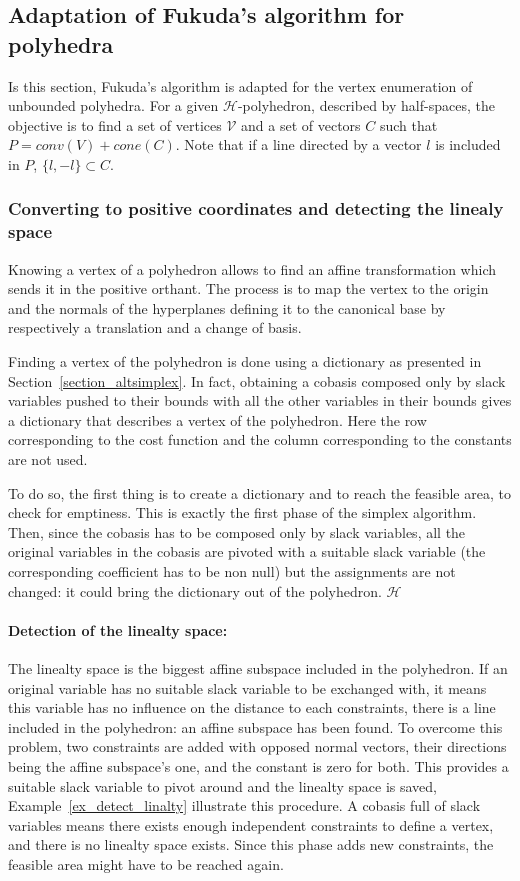 \subsection{Adaptation of Fukuda's algorithm for polyhedra}

Is this section, Fukuda's algorithm is adapted for the vertex enumeration of unbounded polyhedra. For a given $\mathcal{H}$-polyhedron, described by half-spaces, the objective is to find a set of vertices $\mathcal{V}$ and a set of vectors $C$ such that $P = conv(V)+cone(C)$. Note that if a line directed by a vector $l$ is included in $P$, $\{l,-l\}\subset C$. 

\subsubsection{Converting to positive coordinates and detecting the linealy space}

Knowing a vertex of a polyhedron allows to find an affine transformation which sends it in the positive orthant. The process is to map the vertex to the origin and the normals of the hyperplanes defining it to the canonical base by respectively a translation and a change of basis.

Finding a vertex of the polyhedron is done using a dictionary as presented in Section~\ref{section_altsimplex}. In fact, obtaining a cobasis composed only by slack variables pushed to their bounds with all the other variables in their bounds gives a dictionary that describes a vertex of the polyhedron. Here the row corresponding to the cost function and the column corresponding to the constants are not used.


To do so, the first thing is to create a dictionary and to reach the feasible area, to check for emptiness. This is exactly the first phase of the simplex algorithm. Then, since the cobasis has to be composed only by slack variables, all the original variables in the cobasis are pivoted with a suitable slack variable (the corresponding coefficient has to be non null) but the assignments are not changed: it could bring the dictionary out of the polyhedron. 
$\mathcal{H}$
\paragraph*{Detection of the linealty space:} The linealty space is the biggest affine subspace included in the polyhedron. If an original variable has no suitable slack variable to be exchanged with, it means this variable has no influence on the distance to each constraints, there is a line included in the polyhedron: an affine subspace has been found. To overcome this problem, two constraints are added with opposed normal vectors, their directions being the affine subspace's one, and the constant is zero for both. This provides a suitable slack variable to pivot around and the linealty space is saved, Example~\ref{ex_detect_linalty} illustrate this procedure. A cobasis full of slack variables means there exists enough independent constraints to define a vertex, and there is no linealty space exists. Since this phase adds new constraints, the feasible area might have to be reached again.

